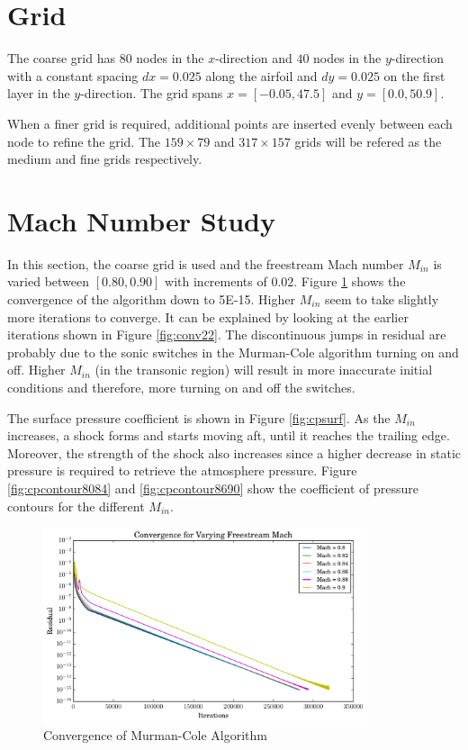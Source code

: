 \documentclass[letterpaper,12pt,]{article}
\begin{document}



\section*{Grid}

The coarse grid has $80$ nodes in the $x$-direction and $40$ nodes in the $y$-direction with a constant spacing $dx = 0.025$ along the airfoil and $dy=0.025$ on the first layer in the $y$-direction.
The grid spans $x=[-0.05, 47.5]$ and $y=[0.0, 50.9]$.

When a finer grid is required, additional points are inserted evenly between each node to refine the grid.
The $159 \times 79$ and $317 \times 157$ grids will be refered as the medium and fine grids respectively.

\section*{Mach Number Study}

In this section, the coarse grid is used and the freestream Mach number $M_{in}$ is varied between $[0.80,0.90]$ with increments of $0.02$.
Figure \ref{fig:conv2} shows the convergence of the algorithm down to 5\textsc{E-}15.
Higher $M_{in}$ seem to take slightly more iterations to converge.
It can be explained by looking at the earlier iterations shown in Figure \ref{fig:conv22}.
The discontinuous jumps in residual are probably due to the sonic switches in the Murman-Cole algorithm turning on and off.
Higher $M_{in}$ (in the transonic region) will result in more inaccurate initial conditions and therefore, more turning on and off the switches.

The surface pressure coefficient is shown in Figure \ref{fig:cpsurf}.
As the $M_{in}$ increases, a shock forms and starts moving aft, until it reaches the trailing edge.
Moreover, the strength of the shock also increases since a higher decrease in static pressure is required to retrieve the atmosphere pressure.
Figure \ref{fig:cpcontour8084} and \ref{fig:cpcontour8690} show the coefficient of pressure contours for the different $M_{in}$.

\begin{figure}[!htbp]
    \centering
    \includegraphics[width = 0.85\textwidth]{./Figures/convergenceq2.pdf}
    \caption{Convergence of Murman-Cole Algorithm}
    \label{fig:conv2}
\end{figure}
\end{document}
